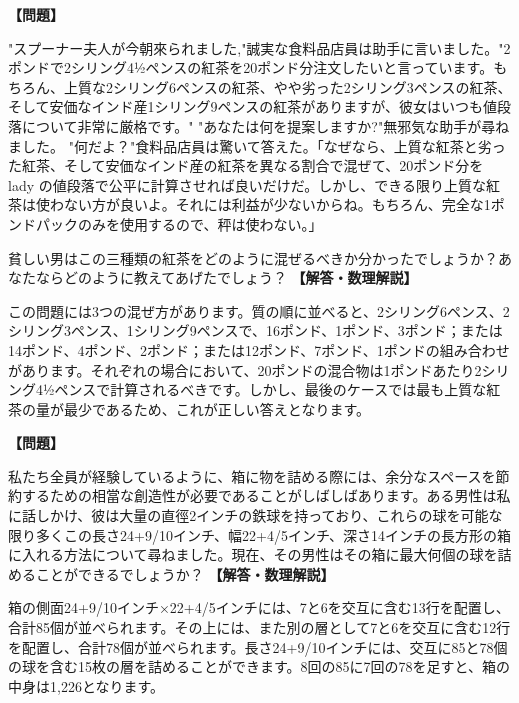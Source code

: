 \documentclass[10pt,a4paper,oneside,openany]{ltjsbook}
\begin{document}
\begin{tcolorbox}[colback=softblue,colframe=primaryblue,title=\textbf{第 369 問：ミックスする紅茶 （原題: MIXING THE TEA.）},arc=2mm,boxrule=1pt,breakable]
\textbf{【問題】}\par\vspace{0.3em}
"スプーナー夫人が今朝來られました,"誠実な食料品店員は助手に言いました。"2ポンドで2シリング4½ペンスの紅茶を20ポンド分注文したいと言っています。もちろん、上質な2シリング6ペンスの紅茶、やや劣った2シリング3ペンスの紅茶、そして安価なインド産1シリング9ペンスの紅茶がありますが、彼女はいつも値段落について非常に厳格です。" "あなたは何を提案しますか?"無邪気な助手が尋ねました。 "何だよ？"食料品店員は驚いて答えた。「なぜなら、上質な紅茶と劣った紅茶、そして安価なインド産の紅茶を異なる割合で混ぜて、20ポンド分を lady の値段落で公平に計算させれば良いだけだ。しかし、できる限り上質な紅茶は使わない方が良いよ。それには利益が少ないからね。もちろん、完全な1ポンドパックのみを使用するので、秤は使わない。」

貧しい男はこの三種類の紅茶をどのように混ぜるべきか分かったでしょうか？あなたならどのように教えてあげたでしょう？
\tcblower
\textbf{【解答・数理解説】}\par\vspace{0.3em}
この問題には3つの混ぜ方があります。質の順に並べると、2シリング6ペンス、2シリング3ペンス、1シリング9ペンスで、16ポンド、1ポンド、3ポンド；または14ポンド、4ポンド、2ポンド；または12ポンド、7ポンド、1ポンドの組み合わせがあります。それぞれの場合において、20ポンドの混合物は1ポンドあたり2シリング4½ペンスで計算されるべきです。しかし、最後のケースでは最も上質な紅茶の量が最少であるため、これが正しい答えとなります。
\end{tcolorbox}

\begin{tcolorbox}[colback=softblue,colframe=primaryblue,title=\textbf{第 370 問：詰め込みパズル （原題: A PACKING PUZZLE.）},arc=2mm,boxrule=1pt,breakable]
\textbf{【問題】}\par\vspace{0.3em}
私たち全員が経験しているように、箱に物を詰める際には、余分なスペースを節約するための相當な創造性が必要であることがしばしばあります。ある男性は私に話しかけ、彼は大量の直徑2インチの鉄球を持っており、これらの球を可能な限り多くこの長さ24+9/10インチ、幅22+4/5インチ、深さ14インチの長方形の箱に入れる方法について尋ねました。現在、その男性はその箱に最大何個の球を詰めることができるでしょうか？
\tcblower
\textbf{【解答・数理解説】}\par\vspace{0.3em}
箱の側面24+9/10インチ×22+4/5インチには、7と6を交互に含む13行を配置し、合計85個が並べられます。その上には、また別の層として7と6を交互に含む12行を配置し、合計78個が並べられます。長さ24+9/10インチには、交互に85と78個の球を含む15枚の層を詰めることができます。8回の85に7回の78を足すと、箱の中身は1,226となります。
\end{tcolorbox}
\end{document}
